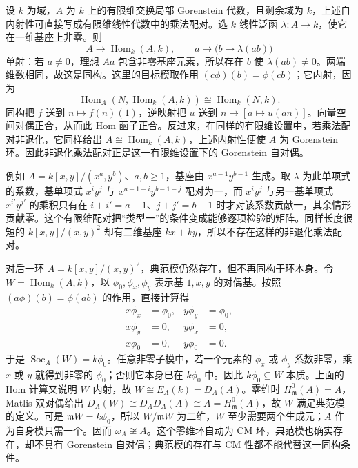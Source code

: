 设 \(k\) 为域，\(A\) 为 \(k\) 上的有限维交换局部 Gorenstein 代数，且剩余域为 \(k\)，上述自内射性可直接写成有限维线性代数中的乘法配对。选 \(k\) 线性泛函 \(\lambda:A\to k\)，使它在一维基座上非零。则
\[
	A\longrightarrow\operatorname{Hom}_k(A,k),\qquad a\longmapsto\bigl(b\longmapsto\lambda(ab)\bigr)
\]
单射：若 \(a\ne0\)，理想 \(Aa\) 包含非零基座元素，所以存在 \(b\) 使 \(\lambda(ab)\ne0\)。两端维数相同，故这是同构。这里的目标模取作用 \((c\phi)(b)=\phi(cb)\)；它内射，因为
\[
	\operatorname{Hom}_A(N,\operatorname{Hom}_k(A,k))\cong\operatorname{Hom}_k(N,k).
\]
同构把 \(f\) 送到 \(n\mapsto f(n)(1)\)，逆映射把 \(u\) 送到 \(n\mapsto[a\mapsto u(an)]\)。向量空间对偶正合，从而此 Hom 函子正合。反过来，在同样的有限维设置中，若乘法配对非退化，它同样给出 \(A\cong\operatorname{Hom}_k(A,k)\)，上述内射性便使 \(A\) 为 Gorenstein 环。因此非退化乘法配对正是这一有限维设置下的 Gorenstein 自对偶。

\ProseParagraphBreak
例如 \(A=k[x,y]/(x^a,y^b)\)、\(a,b\ge1\)，基座由 \(x^{a-1}y^{b-1}\) 生成。取 \(\lambda\) 为此单项式的系数，基单项式 \(x^iy^j\) 与 \(x^{a-1-i}y^{b-1-j}\) 配对为一，而 \(x^iy^j\) 与另一基单项式 \(x^{i'}y^{j'}\) 的乘积只有在 \(i+i'=a-1\)、\(j+j'=b-1\) 时才对该系数贡献一，其余情形贡献零。这个有限维配对把“类型一”的条件变成能够逐项检验的矩阵。同样长度很短的 \(k[x,y]/(x,y)^2\) 却有二维基座 \(kx+ky\)，所以不存在这样的非退化乘法配对。

\ProseParagraphBreak
对后一环 \(A=k[x,y]/(x,y)^2\)，典范模仍然存在，但不再同构于环本身。令 \(W=\operatorname{Hom}_k(A,k)\)，以 \(\phi_0,\phi_x,\phi_y\) 表示基 \(1,x,y\) 的对偶基。按照 \((a\phi)(b)=\phi(ab)\) 的作用，直接计算得
\[
	\begin{aligned}
		x\phi_x&=\phi_0,& y\phi_y&=\phi_0,\\
		x\phi_y&=0,& y\phi_x&=0,\\
		x\phi_0&=0,& y\phi_0&=0.
	\end{aligned}
\]
于是 \(\operatorname{Soc}_A(W)=k\phi_0\)。任意非零子模中，若一个元素的 \(\phi_x\) 或 \(\phi_y\) 系数非零，乘 \(x\) 或 \(y\) 就得到非零的 \(\phi_0\)；否则它本身已在 \(k\phi_0\) 中。因此 \(k\phi_0\subseteq W\) 本质。上面的 Hom 计算又说明 \(W\) 内射，故 \(W\cong E_A(k)=D_A(A)\)。零维时 \(H^0_{\mathfrak m}(A)=A\)，Matlis 双对偶给出 \(D_A(W)\cong D_AD_A(A)\cong A=H^0_{\mathfrak m}(A)\)，故 \(W\) 满足典范模的定义。可是 \(\mathfrak mW=k\phi_0\)，所以 \(W/\mathfrak mW\) 为二维，\(W\) 至少需要两个生成元；\(A\) 作为自身模只需一个。因而 \(\omega_A\not\cong A\)。这个零维环自动为 CM 环，典范模也确实存在，却不具有 Gorenstein 自对偶；典范模的存在与 CM 性都不能代替这一同构条件。

